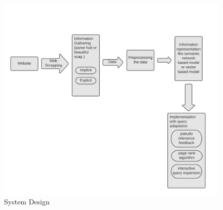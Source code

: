 \begin{figure}[h!]
    \begin{center}
        \includegraphics[scale=0.25]{sys}
        \caption{System Design}
    \end{center}
\end{figure}


